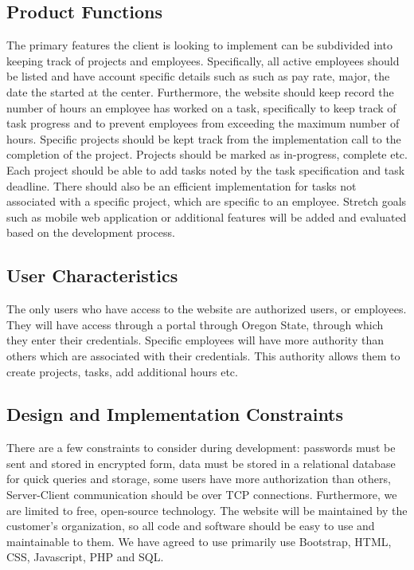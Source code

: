 \documentclass[letterpaper,10pt,titlepage,journal,compsoc,draftclsnofoot,onecolumn]{IEEEtran}
\begin{document}
\subsection{Product Functions}

The primary features the client is looking to implement can be subdivided into keeping track of projects and employees. Specifically, all active employees should be listed and have account specific details such as such as pay rate, major, the date the started at the center. Furthermore, the website should keep record the number of hours an employee has worked on a task, specifically to keep track of task progress and to prevent employees from exceeding the maximum number of hours. Specific projects should be kept track from the implementation call to the completion of the project. Projects should be marked as in-progress, complete etc. Each project should be able to add tasks noted by the task specification and task deadline. There should also be an efficient implementation for tasks not associated with a specific project, which are specific to an employee. Stretch goals such as mobile web application or additional features will be added and evaluated based on the development process. 

\subsection{User Characteristics}

The only users who have access to the website are authorized users, or employees. They will have access through a portal through Oregon State, through which they enter their credentials. Specific employees will have more authority than others which are associated with their credentials. This authority allows them to create projects, tasks, add additional hours etc.

\subsection{Design and Implementation Constraints}

There are a few constraints to consider during development: passwords must be sent and stored in encrypted form, data must be stored in a relational database for quick queries and storage, some users have more authorization than others, Server-Client communication should be over TCP connections. Furthermore, we are limited to free, open-source technology. The website will be maintained by the customer’s organization, so all code and software should be easy to use and maintainable to them. We have agreed to use primarily use Bootstrap, HTML, CSS, Javascript, PHP and SQL.
\end{document}
